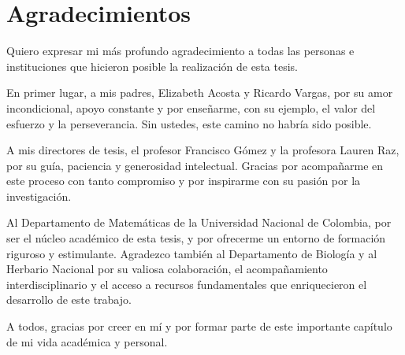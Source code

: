\chapter*{\sffamily Agradecimientos}
%

Quiero expresar mi más profundo agradecimiento a todas las personas e instituciones que hicieron posible la realización de esta tesis.

En primer lugar, a mis padres, Elizabeth Acosta y Ricardo Vargas, por su amor incondicional, apoyo constante y por enseñarme, con su ejemplo, el valor del esfuerzo y la perseverancia. Sin ustedes, este camino no habría sido posible.

A mis directores de tesis, el profesor Francisco Gómez y la profesora Lauren Raz, por su guía, paciencia y generosidad intelectual. Gracias por acompañarme en este proceso con tanto compromiso y por inspirarme con su pasión por la investigación.

Al Departamento de Matemáticas de la Universidad Nacional de Colombia, por ser el núcleo académico de esta tesis, y por ofrecerme un entorno de formación riguroso y estimulante. Agradezco también al Departamento de Biología y al Herbario Nacional por su valiosa colaboración, el acompañamiento interdisciplinario y el acceso a recursos fundamentales que enriquecieron el desarrollo de este trabajo.

A todos, gracias por creer en mí y por formar parte de este importante capítulo de mi vida académica y personal.